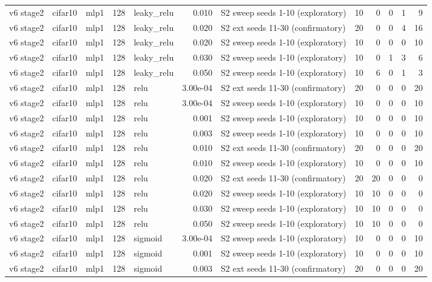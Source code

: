 \begin{table}[htbp]
{\begin{tabular}{@{}lllrlrlrrrrr@{}}
v6 stage2 & cifar10 & mlp1 & 128 & leaky\_relu & 0.010 & S2 sweep seeds 1-10 (exploratory) & 10 & 0 & 0 & 1 & 9 \\
v6 stage2 & cifar10 & mlp1 & 128 & leaky\_relu & 0.020 & S2 ext seeds 11-30 (confirmatory) & 20 & 0 & 0 & 4 & 16 \\
v6 stage2 & cifar10 & mlp1 & 128 & leaky\_relu & 0.020 & S2 sweep seeds 1-10 (exploratory) & 10 & 0 & 0 & 0 & 10 \\
v6 stage2 & cifar10 & mlp1 & 128 & leaky\_relu & 0.030 & S2 sweep seeds 1-10 (exploratory) & 10 & 0 & 1 & 3 & 6 \\
v6 stage2 & cifar10 & mlp1 & 128 & leaky\_relu & 0.050 & S2 sweep seeds 1-10 (exploratory) & 10 & 6 & 0 & 1 & 3 \\
v6 stage2 & cifar10 & mlp1 & 128 & relu & 3.00e-04 & S2 ext seeds 11-30 (confirmatory) & 20 & 0 & 0 & 0 & 20 \\
v6 stage2 & cifar10 & mlp1 & 128 & relu & 3.00e-04 & S2 sweep seeds 1-10 (exploratory) & 10 & 0 & 0 & 0 & 10 \\
v6 stage2 & cifar10 & mlp1 & 128 & relu & 0.001 & S2 sweep seeds 1-10 (exploratory) & 10 & 0 & 0 & 0 & 10 \\
v6 stage2 & cifar10 & mlp1 & 128 & relu & 0.003 & S2 sweep seeds 1-10 (exploratory) & 10 & 0 & 0 & 0 & 10 \\
v6 stage2 & cifar10 & mlp1 & 128 & relu & 0.010 & S2 ext seeds 11-30 (confirmatory) & 20 & 0 & 0 & 0 & 20 \\
v6 stage2 & cifar10 & mlp1 & 128 & relu & 0.010 & S2 sweep seeds 1-10 (exploratory) & 10 & 0 & 0 & 0 & 10 \\
v6 stage2 & cifar10 & mlp1 & 128 & relu & 0.020 & S2 ext seeds 11-30 (confirmatory) & 20 & 20 & 0 & 0 & 0 \\
v6 stage2 & cifar10 & mlp1 & 128 & relu & 0.020 & S2 sweep seeds 1-10 (exploratory) & 10 & 10 & 0 & 0 & 0 \\
v6 stage2 & cifar10 & mlp1 & 128 & relu & 0.030 & S2 sweep seeds 1-10 (exploratory) & 10 & 10 & 0 & 0 & 0 \\
v6 stage2 & cifar10 & mlp1 & 128 & relu & 0.050 & S2 sweep seeds 1-10 (exploratory) & 10 & 10 & 0 & 0 & 0 \\
v6 stage2 & cifar10 & mlp1 & 128 & sigmoid & 3.00e-04 & S2 sweep seeds 1-10 (exploratory) & 10 & 0 & 0 & 0 & 10 \\
v6 stage2 & cifar10 & mlp1 & 128 & sigmoid & 0.001 & S2 sweep seeds 1-10 (exploratory) & 10 & 0 & 0 & 0 & 10 \\
v6 stage2 & cifar10 & mlp1 & 128 & sigmoid & 0.003 & S2 ext seeds 11-30 (confirmatory) & 20 & 0 & 0 & 0 & 20 \\

\end{tabular}}
\end{table}
